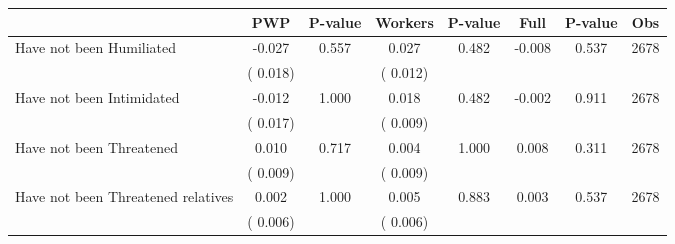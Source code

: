 
\begin{tabular}{l*{7}{c}}\hline&\multicolumn{1}{c}{PWP}&\multicolumn{1}{c}{P-value}&\multicolumn{1}{c}{Workers}&\multicolumn{1}{c}{P-value}&\multicolumn{1}{c}{Full}&\multicolumn{1}{c}{P-value}&\multicolumn{1}{c}{Obs} \\ \hline

 Have not been Humiliated       &             -0.027       &        0.557  &              0.027       &        0.482  &             -0.008       &              0.537 &  2678 \\ 
                       &       (       0.018)             &                               &       (       0.012)                     &                               &                                               &                                &                      \\ 

 Have not been Intimidated       &             -0.012       &        1.000  &              0.018       &        0.482  &             -0.002       &              0.911 &  2678 \\ 
                       &       (       0.017)             &                               &       (       0.009)                     &                               &                                               &                                &                      \\ 

 Have not been Threatened       &              0.010       &        0.717  &              0.004       &        1.000  &              0.008       &              0.311 &  2678 \\ 
                       &       (       0.009)             &                               &       (       0.009)                     &                               &                                               &                                &                      \\ 

 Have not been Threatened relatives       &              0.002       &        1.000  &              0.005       &        0.883  &              0.003       &              0.537 &  2678 \\ 
                       &       (       0.006)             &                               &       (       0.006)                     &                               &                                               &                                &                      \\ 


\end{tabular}
